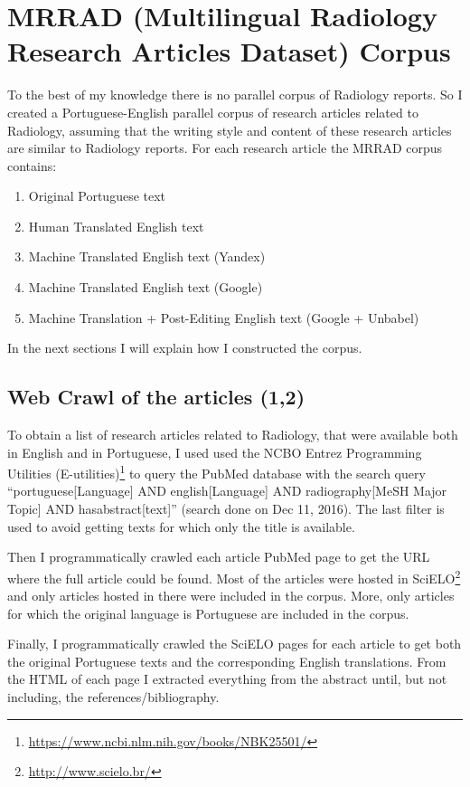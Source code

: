 \label{chap3}

\section{MRRAD (Multilingual Radiology Research Articles Dataset) Corpus}

To the best of my knowledge there is no parallel corpus of Radiology reports. So I created a Portuguese-English parallel corpus of research articles related to Radiology, assuming that the writing style and content of these research articles are similar to Radiology reports. For each research article the MRRAD corpus contains:

\begin{enumerate}
\item Original Portuguese text
\item Human Translated English text
\item Machine Translated English text (Yandex) 
\item Machine Translated English text (Google) 
\item Machine Translation + Post-Editing English text (Google + Unbabel) 
\end{enumerate}

\noindent In the next sections I will explain how I constructed the corpus. 

\subsection{Web Crawl of the articles (1,2)}

To obtain a list of research articles related to Radiology, that were available both in English and in Portuguese, I used used the  NCBO Entrez Programming Utilities (E-utilities)\footnote{\url{https://www.ncbi.nlm.nih.gov/books/NBK25501/}} to query the PubMed database with the search query “portuguese[Language] AND english[Language] AND radiography[MeSH Major Topic] AND hasabstract[text]” (search done on Dec 11, 2016). The last filter is used to avoid getting texts for which only the title is available. 

Then I programmatically crawled each article PubMed page to get the URL where the full article could be found. Most of the articles were hosted in SciELO\footnote{\url{http://www.scielo.br/}} and only articles hosted in there were included in the corpus. More, only articles for which the original language is Portuguese are included in the corpus. 

Finally, I programmatically crawled the SciELO pages for each article to get both the original Portuguese texts and the corresponding English translations. From the HTML of each page I extracted everything from the abstract until, but not including, the references/bibliography.

